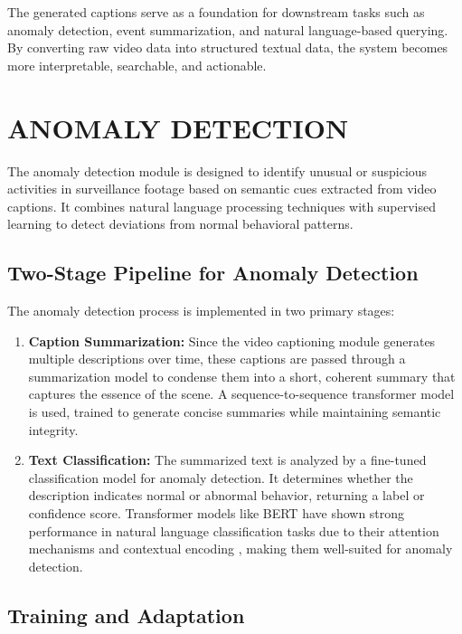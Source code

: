 The generated captions serve as a foundation for downstream tasks such as anomaly detection, event summarization, and natural language-based querying. By converting raw video data into structured textual data, the system becomes more interpretable, searchable, and actionable.

\section{\MakeUppercase{Anomaly Detection}}

The anomaly detection module is designed to identify unusual or suspicious activities in surveillance footage based on semantic cues extracted from video captions. It combines natural language processing techniques with supervised learning to detect deviations from normal behavioral patterns.

\subsection{Two-Stage Pipeline for Anomaly Detection}

The anomaly detection process is implemented in two primary stages:

\begin{enumerate}
\item \textbf{Caption Summarization:}  
Since the video captioning module generates multiple descriptions over time, these captions are passed through a summarization model to condense them into a short, coherent summary that captures the essence of the scene. A sequence-to-sequence transformer model is used, trained to generate concise summaries while maintaining semantic integrity.

\item \textbf{Text Classification:}  
The summarized text is analyzed by a fine-tuned classification model for anomaly detection. It determines whether the description indicates normal or abnormal behavior, returning a label or confidence score. Transformer models like BERT have shown strong performance in natural language classification tasks due to their attention mechanisms and contextual encoding \cite{meem2023improving}, making them well-suited for anomaly detection.


\end{enumerate}

\subsection{Training and Adaptation}

